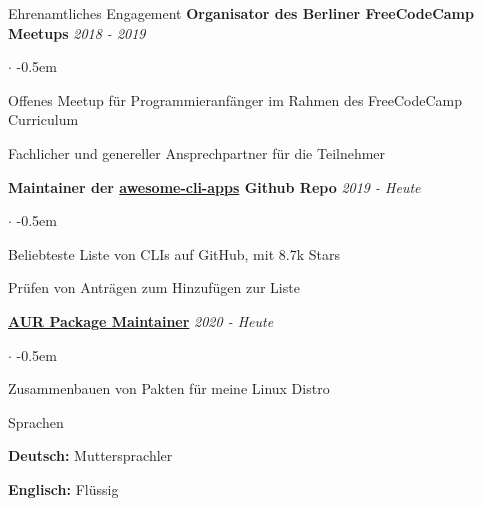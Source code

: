 \documentclass{cv}
\begin{document}
\begin{rSection}{Ehrenamtliches Engagement}
  {\bf Organisator des Berliner FreeCodeCamp Meetups}
  \hfill
  {\em 2018 - 2019}

  \begin{list}{$\cdot$}{}
    \itemsep -0.5em \vspace{-0.5em}
    \smallskip
    \item Offenes Meetup für Programmieranfänger im Rahmen des FreeCodeCamp Curriculum
    \item Fachlicher und genereller Ansprechpartner für die Teilnehmer
  \end{list}

  {\bf Maintainer der \href{https://github.com/agarrharr/awesome-cli-apps}{awesome-cli-apps} Github Repo}
  \hfill
  {\em 2019 - Heute}

  \begin{list}{$\cdot$}{}
    \itemsep -0.5em \vspace{-0.5em}
    \smallskip
    \item Beliebteste Liste von CLIs auf GitHub, mit 8.7k Stars
    \item Prüfen von Anträgen zum Hinzufügen zur Liste
  \end{list}

  {\bf \href{https://aur.archlinux.org/packages/?SeB=m&K=jneidel}{AUR Package Maintainer}}
  \hfill
  {\em 2020 - Heute}

  \begin{list}{$\cdot$}{}
    \itemsep -0.5em \vspace{-0.5em}
    \smallskip
    \item Zusammenbauen von Pakten für meine Linux Distro
  \end{list}
\end{rSection}

\begin{rSection}{Sprachen}
  \begin{minipage}[l]{0.48\linewidth}
  {\bf Deutsch:} Muttersprachler
  \end{minipage}
  \begin{minipage}[l]{0.48\linewidth}
  {\bf Englisch:} Flüssig \hfill
  \end{minipage}
\end{rSection}
\end{document}
